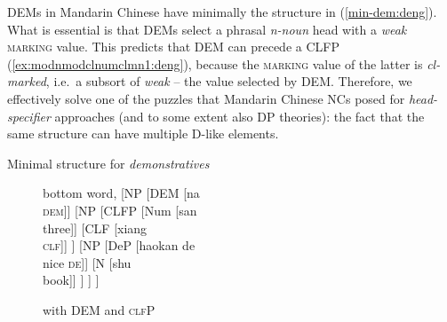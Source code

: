 \documentclass[output=paper,colorlinks,citecolor=brown]{langscibook}
\begin{document}
DEMs in Mandarin Chinese have minimally the structure in (\ref{min-dem:deng}). What is essential is that DEMs select a phrasal \textit{n-noun} head with a \textit{weak} \textsc{marking} value. %
%
%
This predicts  that DEM can precede a CLFP  (\ref{ex:modnmodclnumclmn1:deng}), because the \textsc{marking} value of the latter is \textit{cl-marked}, i.e.\ a subsort of \textit{weak} -- the value selected by DEM.  Therefore, we effectively solve one of the puzzles that Mandarin Chinese NCs posed for  \textit{head-specifier} approaches (and to some extent also DP theories): the fact that the same structure can have multiple D-like elements. 


\ea Minimal structure for \textit{demonstratives}  \\
      \label{min-dem:deng}
\z

\begin{figure}
  \centering
			\begin{forest}
				bottom word,
				[NP
				[DEM [na \\ \textsc{dem}]]
				[NP
				[CLFP
				[Num [san \\ three]]
				[CLF [xiang \\ \textsc{clf}]]
				]
				[NP
				[DeP [haokan de\\ nice \textsc{de}]]
				[N]
				]
				]
				]
			\end{forest}
  \caption{ with DEM and \textsc{clf}P}
  \label{fig:npw2spec:deng}
\end{figure}
\end{document}
